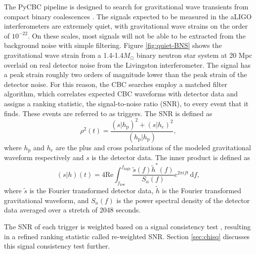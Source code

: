 The PyCBC pipeline is designed to search for gravitational wave transients from compact binary
coalescences \cite{Usman:2015kfa}. 
The signals expected to be measured in the aLIGO interferometers are extremely quiet, 
with gravitational wave strains on the order of $10^{-22}$. On these scales, most 
signals will not be able to be extracted from the background noise with simple filtering. 
Figure \ref{fig:quiet-BNS} shows the gravitational wave strain from a 1.4-1.4$M_{\odot}$ 
binary neutron star system at 20 Mpc overlaid on real detector noise from the Livingston 
interferometer. The signal has a peak strain roughly two orders of magnitude lower than 
the peak strain of the detector noise. 
For this reason, the CBC searches employ a matched filter algorithm, which correlates expected CBC
waveforms with detector data and assigns a ranking statistic, the signal-to-noise ratio (SNR),
to every event that it finds. These events are referred to as triggers.
The SNR is defined as 
\begin{equation}
\rho^2(t) = \frac{(s|h_\mathrm{p})^2 + (s|h_\mathrm{c})^2}{(h_\mathrm{p}|h_\mathrm{p})},
\label{eq:snr}
\end{equation}
where $h_\mathrm{p}$ and $h_\mathrm{c}$ are the plus and cross polarizations of the 
modeled gravitational waveform respectively and $s$ is the detector data. The inner product 
is defined as
\begin{equation}
(s|h)(t) = 4\mathrm{Re}\int_{f_\mathrm{low}}^{f_\mathrm{high}} \frac{\tilde{s}(f)\tilde{h}^*(f)}{S_n (f)}e^{2\pi i f t}\, \mathrm{d}f,
\label{eq:inner-product}
\end{equation}
where $\tilde{s}$ is the Fourier transformed detector data, $\tilde{h}$ is the Fourier 
transformed gravitational waveform, and $S_n (f)$ is the power spectral 
density of the detector data averaged over a stretch of 2048 seconds.

The SNR of each trigger is weighted based on a signal consistency test \cite{Allen:2004gu},
resulting in a refined ranking statistic called re-weighted SNR.
Section \ref{sec:chisq} discusses this signal consistency test further.


